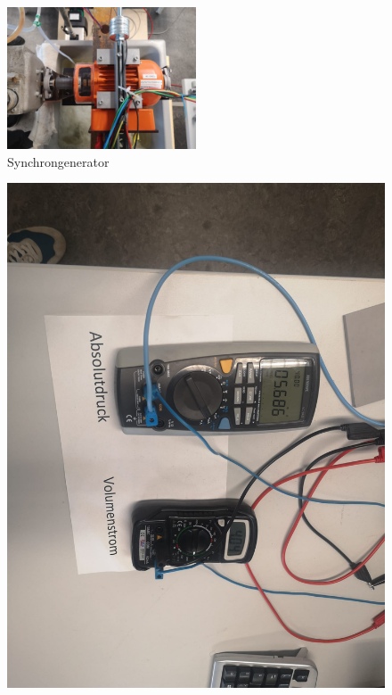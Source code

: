 \begin{figure}[!ht]
    \centering
    \includegraphics[width=0.5\textwidth]{Abbildungen/Generator.jpeg}
    \caption{Synchrongenerator}
    \label{fig:Synchrongenerator}
\end{figure}
\begin{figure}[H]
	\centering
	\begin{minipage}{0.49\textwidth}
		\centering
		\includegraphics[width=1\textwidth]{Abbildungen/Druck- & Volumenstrom-Messung.jpeg}

\end{minipage}
\end{figure}

